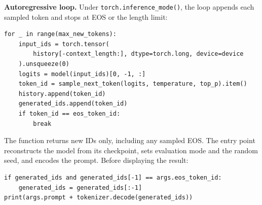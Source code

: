 \textbf{Autoregressive loop.} Under \texttt{torch.inference\_mode()},
the loop appends each sampled token and stops at EOS or the length limit:
\par\noindent
\begin{minipage}{\linewidth}
\begin{lstlisting}[caption={Generation loop for one prompt}]
for _ in range(max_new_tokens):
    input_ids = torch.tensor(
        history[-context_length:], dtype=torch.long, device=device
    ).unsqueeze(0)
    logits = model(input_ids)[0, -1, :]
    token_id = sample_next_token(logits, temperature, top_p).item()
    history.append(token_id)
    generated_ids.append(token_id)
    if token_id == eos_token_id:
        break
\end{lstlisting}
\end{minipage}\par
The function returns new IDs only, including any sampled EOS. The entry
point reconstructs the model from its checkpoint, sets evaluation mode and
the random seed, and encodes the prompt. Before displaying the result:
\par\noindent
\begin{minipage}{\linewidth}
\begin{lstlisting}[caption={Removing EOS before decoding the completion}]
if generated_ids and generated_ids[-1] == args.eos_token_id:
    generated_ids = generated_ids[:-1]
print(args.prompt + tokenizer.decode(generated_ids))
\end{lstlisting}
\end{minipage}\par


